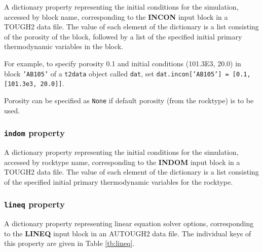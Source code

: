 A dictionary property representing the initial conditions for the simulation, accessed by block name, corresponding to the \textbf{INCON} input block in a TOUGH2 data file.  The value of each element of the dictionary is a list consisting of the porosity of the block, followed by a list of the specified initial primary thermodynamic variables in the block.

For example, to specify porosity 0.1 and initial conditions (101.3E3, 20.0) in block \texttt{'AB105'} of a \texttt{t2data} object called \texttt{dat}, set \texttt{dat.incon['AB105'] = [0.1, [101.3e3, 20.0]]}.

Porosity can be specified as \texttt{None} if default porosity (from the rocktype) is to be used.

\begin{snugshade}
\subsubsection{\texttt{indom} property}
\end{snugshade}
\label{sec:t2data:indom}

A dictionary property representing the initial conditions for the simulation, accessed by rocktype name, corresponding to the \textbf{INDOM} input block in a TOUGH2 data file.  The value of each element of the dictionary is a list consisting of the specified initial primary thermodynamic variables for the rocktype.

\begin{snugshade}
\subsubsection{\texttt{lineq} property}
\end{snugshade}
\label{sec:t2data:lineq}

A dictionary property representing linear equation solver options, corresponding to the \textbf{LINEQ} input block in an AUTOUGH2 data file.  The individual keys of this property are given in Table \ref{tb:lineq}.

